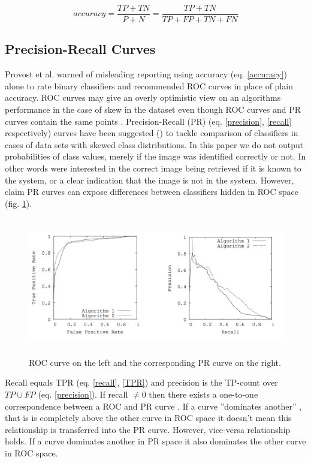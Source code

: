 \documentclass[english,12pt,a4paper,pdftex,elec,utf8]{aaltothesis}
\begin{document}
\begin{equation}\label{accuracy}
accuracy = \frac{TP + TN}{P + N} = \frac{TP +TN}{TP + FP + TN + FN}
\end{equation}

\subsection{Precision-Recall Curves}\label{PRSection}
Provost et al. warned of misleading reporting using accuracy (eq. \ref{accuracy}) alone to rate binary classifiers \cite{Provost1997} and recommended ROC curves in place of plain accuracy. ROC curves may give an overly optimistic view on an algorithms performance in the case of skew in the dataset even though ROC curves and PR curves contain the same points \cite{Davis2006}. Precision-Recall (PR) (eq. \ref{precision}, \ref{recall} respectively) curves have been suggested (\cite{craven2005markov}) to tackle comparison of classifiers in cases of data sets with skewed class distributions. In this paper we do not output probabilities of class values, merely if the image was identified correctly or not. In other words were interested in the correct image being retrieved if it is known to the system, or a clear indication that the image is not in the system. However, \cite{Davis2006} claim PR curves can expose differences between classifiers hidden in ROC space (fig. \ref{rocpr}).

\begin{figure}[htb]
\begin{center}
\includegraphics[height=6cm]{figures/rocpr}
\end{center}
\caption{ROC curve on the left and the corresponding PR curve on the right. \cite{Davis2006}}
\label{rocpr}
\end{figure}

Recall equals TPR (eq. \ref{recall}, \ref{TPR}) and precision is the TP-count over $TP \cup FP$ (eq. \ref{precision}). If recall $\neq 0$ then there exists a one-to-one correspondence between a ROC and PR curve \cite{Davis2006}. If a curve ''dominates another'' \cite{Provost1997}, that is is completely above the other curve in ROC space it doesn't mean this relationship is transferred into the PR curve. However, vice-versa relationship holds. If a curve dominates another in PR space it also dominates the other curve in ROC space. \cite{Davis2006}
\end{document}
